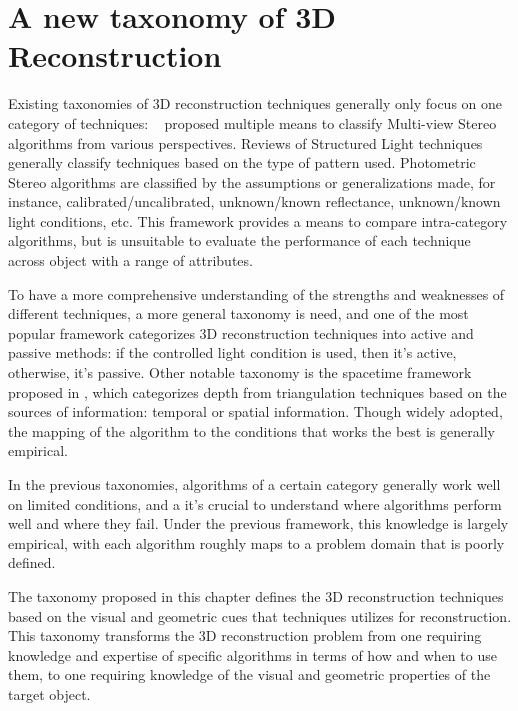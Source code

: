 
\chapter{A new taxonomy of 3D Reconstruction}
\label{ch:3DRecon_Taxo}
Existing taxonomies of 3D reconstruction techniques generally only focus on one category of techniques: ~\citeauthor{seitz2006comparison} proposed  multiple means to classify Multi-view Stereo algorithms from various perspectives. Reviews \cite{geng2011structured, salvi2004pattern} of Structured Light techniques generally classify techniques based on the type of pattern used. Photometric Stereo algorithms are classified by the assumptions or generalizations made, for instance, calibrated/uncalibrated, unknown/known reflectance, unknown/known light conditions, etc. This framework provides a means to compare intra-category algorithms, but is unsuitable to evaluate the performance of each technique across object with a range of attributes.

To have a more comprehensive understanding of the strengths and weaknesses of different techniques, a more general taxonomy is need, and one of the most popular framework categorizes 3D reconstruction techniques into active and passive methods: if the controlled light condition is used, then it's active, otherwise, it's passive. Other notable taxonomy is the spacetime framework proposed in \cite{davis2003spacetime}, which categorizes depth from triangulation techniques based on the sources of information: temporal or spatial information. Though widely adopted, the mapping of the algorithm to the conditions that works the best is generally empirical.

In the previous taxonomies, algorithms of a certain category generally work well on limited conditions, and a it's crucial to understand where algorithms perform well and where they fail. Under the previous framework, this knowledge is largely empirical, with each algorithm roughly maps to a problem domain that is poorly defined. 

The taxonomy proposed in this chapter defines the 3D reconstruction techniques based on the visual and geometric cues that techniques utilizes for reconstruction. This taxonomy transforms the 3D reconstruction problem from one requiring knowledge and expertise of specific algorithms in terms of how and when to use them, to one requiring knowledge of the visual and geometric properties of the target object.

